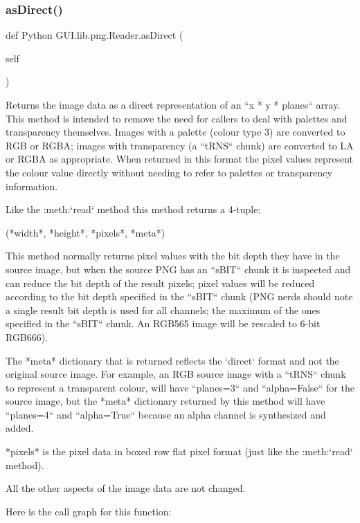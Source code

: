 \subsubsection{\texorpdfstring{as\+Direct()}{asDirect()}}
{\footnotesize\ttfamily def Python G\+U\+I.\+lib.\+png.\+Reader.\+as\+Direct (\begin{DoxyParamCaption}\item[{}]{self }\end{DoxyParamCaption})}

\begin{DoxyVerb}Returns the image data as a direct representation of an
``x * y * planes`` array.  This method is intended to remove the
need for callers to deal with palettes and transparency
themselves.  Images with a palette (colour type 3)
are converted to RGB or RGBA; images with transparency (a
``tRNS`` chunk) are converted to LA or RGBA as appropriate.
When returned in this format the pixel values represent the
colour value directly without needing to refer to palettes or
transparency information.

Like the :meth:`read` method this method returns a 4-tuple:

(*width*, *height*, *pixels*, *meta*)

This method normally returns pixel values with the bit depth
they have in the source image, but when the source PNG has an
``sBIT`` chunk it is inspected and can reduce the bit depth of
the result pixels; pixel values will be reduced according to
the bit depth specified in the ``sBIT`` chunk (PNG nerds should
note a single result bit depth is used for all channels; the
maximum of the ones specified in the ``sBIT`` chunk.  An RGB565
image will be rescaled to 6-bit RGB666).

The *meta* dictionary that is returned reflects the `direct`
format and not the original source image.  For example, an RGB
source image with a ``tRNS`` chunk to represent a transparent
colour, will have ``planes=3`` and ``alpha=False`` for the
source image, but the *meta* dictionary returned by this method
will have ``planes=4`` and ``alpha=True`` because an alpha
channel is synthesized and added.

*pixels* is the pixel data in boxed row flat pixel format (just
like the :meth:`read` method).

All the other aspects of the image data are not changed.
\end{DoxyVerb}
 Here is the call graph for this function\+:
\mbox{\label{class_python_01_g_u_i_1_1lib_1_1png_1_1_reader_a8a479ccbda892521dae914d293da0b5c}} 
